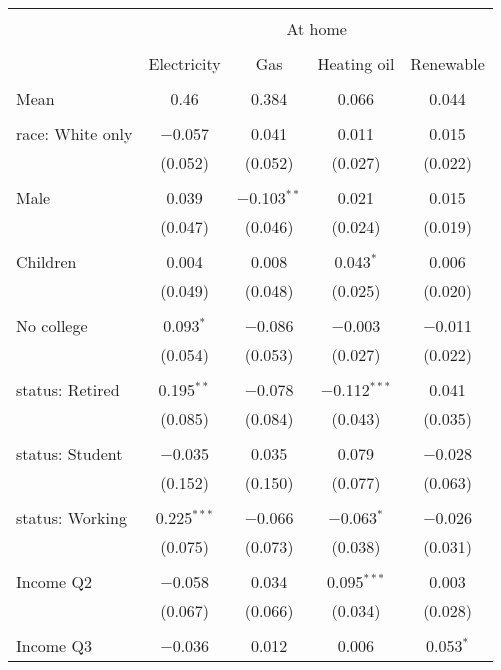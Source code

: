
\begin{tabular}{@{\extracolsep{5pt}}lcccc} 
\\[-1.8ex]\hline 
\hline \\[-1.8ex] 
 & \multicolumn{4}{c}{At home} \\ 
\cline{2-5} 
\\[-1.8ex] & Electricity & Gas & Heating oil & Renewable \\ 
\hline \\[-1.8ex] 
 Mean & 0.46 & 0.384 & 0.066 & 0.044  \\ \hline \\[-1.8ex] race: White only & $-$0.057 & 0.041 & 0.011 & 0.015 \\ 
  & (0.052) & (0.052) & (0.027) & (0.022) \\ 
  & & & & \\ 
 Male & 0.039 & $-$0.103$^{**}$ & 0.021 & 0.015 \\ 
  & (0.047) & (0.046) & (0.024) & (0.019) \\ 
  & & & & \\ 
 Children & 0.004 & 0.008 & 0.043$^{*}$ & 0.006 \\ 
  & (0.049) & (0.048) & (0.025) & (0.020) \\ 
  & & & & \\ 
 No college & 0.093$^{*}$ & $-$0.086 & $-$0.003 & $-$0.011 \\ 
  & (0.054) & (0.053) & (0.027) & (0.022) \\ 
  & & & & \\ 
 status: Retired & 0.195$^{**}$ & $-$0.078 & $-$0.112$^{***}$ & 0.041 \\ 
  & (0.085) & (0.084) & (0.043) & (0.035) \\ 
  & & & & \\ 
 status: Student & $-$0.035 & 0.035 & 0.079 & $-$0.028 \\ 
  & (0.152) & (0.150) & (0.077) & (0.063) \\ 
  & & & & \\ 
 status: Working & 0.225$^{***}$ & $-$0.066 & $-$0.063$^{*}$ & $-$0.026 \\ 
  & (0.075) & (0.073) & (0.038) & (0.031) \\ 
  & & & & \\ 
 Income Q2 & $-$0.058 & 0.034 & 0.095$^{***}$ & 0.003 \\ 
  & (0.067) & (0.066) & (0.034) & (0.028) \\ 
  & & & & \\ 
 Income Q3 & $-$0.036 & 0.012 & 0.006 & 0.053$^{*}$ \\ 

\end{tabular}
